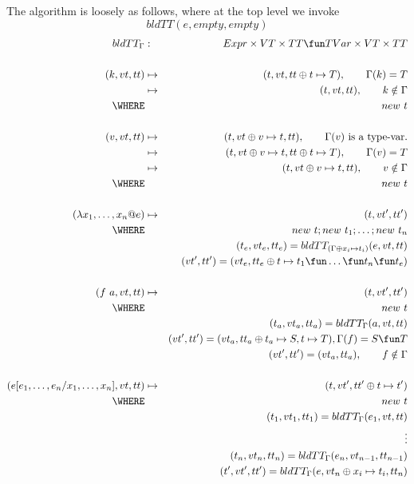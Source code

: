The algorithm is loosely as follows, where at the top level
we invoke
$$bldTT(e,empty,empty)$$
\begin{eqnarray*}
   bldTT_\Gamma &:& Expr \times VT \times TT \fun TVar \times VT \times TT
\\
\\ (k,vt,tt)
   &\mapsto& (t,vt,tt \oplus t \mapsto T), \qquad \Gamma(k)=T
\\ &\mapsto& (t,vt,tt), \qquad k \notin \Gamma
\\ \WHERE && new~t
\\
\\ (v,vt,tt)
   &\mapsto& (t,vt \oplus v \mapsto t,tt), \qquad \Gamma(v) \mbox{ is a type-var.}
\\ &\mapsto& (t,vt \oplus v \mapsto t,tt \oplus t \mapsto T), \qquad \Gamma(v)=T
\\ &\mapsto& (t,vt \oplus v \mapsto t,tt), \qquad v \notin \Gamma
\\ \WHERE && new~t
\\
\\ (\lambda x_1,\ldots,x_n @ e)
   &\mapsto& (t,vt',tt')
\\ \WHERE && new~t; new~t_1; \ldots ; new~t_n
\\ && (t_e,vt_e,tt_e) = bldTT_{(\Gamma\oplus{x_i \mapsto t_i})}(e,vt,tt)
\\ && (vt',tt') = (vt_e,tt_e \oplus t \mapsto t_1 \fun \ldots \fun t_n \fun t_e)
\\
\\ (f~a,vt,tt)
   &\mapsto& (t,vt',tt')
\\ \WHERE && new~t
\\  && (t_a,vt_a,tt_a) = bldTT_\Gamma(a,vt,tt)
\\ && (vt',tt') = (vt_a,tt_a \oplus t_a \mapsto S, t \mapsto T),
   \Gamma(f) = S \fun T
\\ && (vt',tt') = (vt_a,tt_a), \qquad f \notin \Gamma
\\
\\ (e[e_1,\ldots,e_n/x_1,\ldots,x_n],vt,tt)
   &\mapsto& (t,vt',tt' \oplus t \mapsto t')
\\ \WHERE && new~t
\\  && (t_1,vt_1,tt_1) = bldTT_\Gamma(e_1,vt,tt)
\\  && \vdots
\\  && (t_n,vt_n,tt_n) = bldTT_\Gamma(e_n,vt_{n-1},tt_{n-1})
\\  && (t',vt',tt') = bldTT_\Gamma(e,vt_n \oplus x_i \mapsto t_i,tt_n)
\end{eqnarray*}
